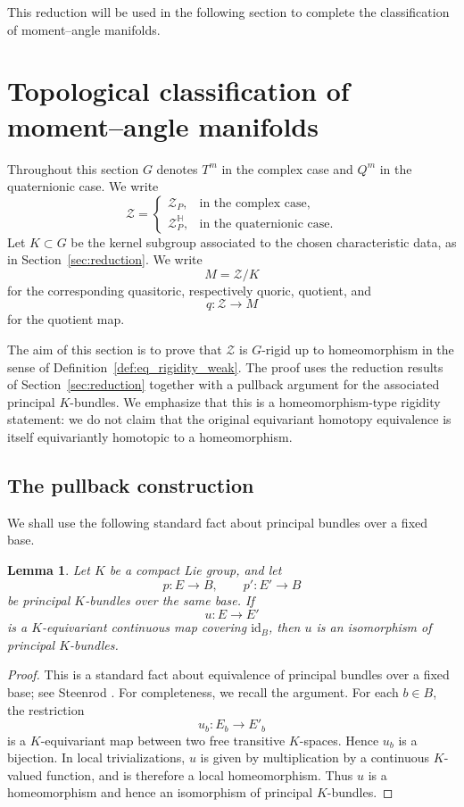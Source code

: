 \documentclass[11pt,a4paper]{article}
\numberwithin{equation}{section}
\newtheorem{lemma}[definition]{Lemma}
\theoremstyle{named}
\begin{document}
This reduction will be used in the following section to complete the classification of moment--angle manifolds.

\section{Topological classification of moment--angle manifolds}
\label{sec:classification}

Throughout this section \(G\) denotes \(T^m\) in the complex case and \(Q^m\) in the quaternionic case.  We write
\[
    \mathcal Z=
    \begin{cases}
    \mathcal Z_P, & \text{in the complex case},\\
    \mathcal Z_P^{\mathbb H}, & \text{in the quaternionic case}.
    \end{cases}
\]
Let \(K\subset G\) be the kernel subgroup associated to the chosen characteristic data, as in Section~\ref{sec:reduction}. We write
\[
    M=\mathcal Z/K
\]
for the corresponding quasitoric, respectively quoric, quotient, and
\[
    q:\mathcal Z\longrightarrow M
\]
for the quotient map.

The aim of this section is to prove that \(\mathcal Z\) is \(G\)-rigid up to homeomorphism in the sense of Definition~\ref{def:eq_rigidity_weak}. The proof uses the reduction results of Section~\ref{sec:reduction} together with a pullback argument for the associated principal \(K\)-bundles.  We emphasize that this is a homeomorphism-type rigidity statement: we do not claim that the original equivariant homotopy equivalence is itself equivariantly homotopic to a homeomorphism.

\subsection{The pullback construction}

We shall use the following standard fact about principal bundles over a fixed base.

\begin{lemma}\label{lem:bundle_map}
Let \(K\) be a compact Lie group, and let
\[
    p:E\to B,
    \qquad
    p':E'\to B
\]
be principal \(K\)-bundles over the same base.  If
\[
    u:E\longrightarrow E'
\]
is a \(K\)-equivariant continuous map covering \(\mathrm{id}_B\), then \(u\) is an isomorphism of principal \(K\)-bundles.
\end{lemma}

\begin{proof}
This is a standard fact about equivalence of principal bundles over a fixed base; see Steenrod \cite[Ch.~I, \S2]{Steenrod}. For completeness, we recall the argument.  For each \(b\in B\), the restriction
\[
    u_b:E_b\longrightarrow E'_b
\]
is a \(K\)-equivariant map between two free transitive \(K\)-spaces. Hence \(u_b\) is a bijection. In local trivializations, \(u\) is given by multiplication by a continuous \(K\)-valued function, and is therefore a local homeomorphism. Thus \(u\) is a homeomorphism and hence an isomorphism of principal \(K\)-bundles.
\end{proof}
\end{document}
